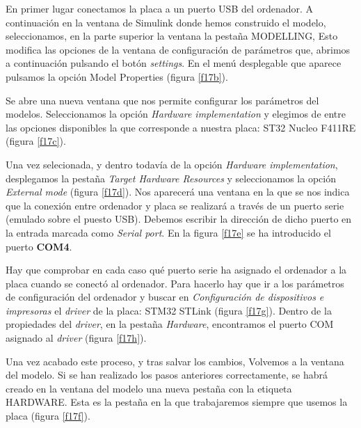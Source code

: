 \documentclass[10pt,a4paper]{report}
\begin{document}
En primer lugar conectamos la placa a un puerto USB del ordenador. A continuación en la ventana de Simulink donde hemos construido el modelo, seleccionamos, en la parte superior la ventana la pestaña MODELLING, Esto modifica las opciones de la ventana de configuración de parámetros que, abrimos a continuación pulsando el botón \emph{settings}. En el menú desplegable que aparece pulsamos la opción Model Properties (figura \ref{f17b}).  

Se abre una nueva ventana que nos permite configurar los parámetros del modelos.  Seleccionamos la opción \emph{Hardware implementation} y elegimos de entre las opciones disponibles la que corresponde a nuestra placa: ST32 Nucleo F411RE (figura \ref{f17c}). 

Una vez selecionada, y dentro todavía de la opción \emph{Hardware implementation}, desplegamos la pestaña \emph{Target Hardware Resources} y seleccionamos la opción \emph{External mode} (figura \ref{f17d}). Nos aparecerá una ventana en la que se nos indica que la conexión entre ordenador y placa se realizará a través de un puerto serie (emulado sobre el puesto USB). Debemos escribir la dirección de dicho puerto en la entrada marcada como \emph{Serial port}. En la figura \ref{f17e} se ha introducido el puerto \textbf{COM4}. 

Hay que comprobar en cada caso qué puerto serie ha asignado el ordenador a la placa cuando se conectó al ordenador. Para hacerlo hay que ir a los parámetros de configuración del ordenador y buscar en \emph{Configuración de dispositivos e impresoras} el \emph{driver} de la placa: STM32 STLink (figura \ref{f17g}). Dentro de la propiedades del \emph{driver}, en la pestaña \emph{Hardware}, encontramos el puerto COM asignado al \emph{driver} (figura \ref{f17h}).

Una vez acabado este proceso, y tras salvar los cambios, Volvemos a la ventana del modelo. Si se han realizado los pasos anteriores correctamente, se habrá creado en la ventana del modelo una nueva pestaña con la etiqueta HARDWARE. Esta es la pestaña en la que trabajaremos siempre que usemos la placa (figura \ref{f17f}). 
\end{document}
